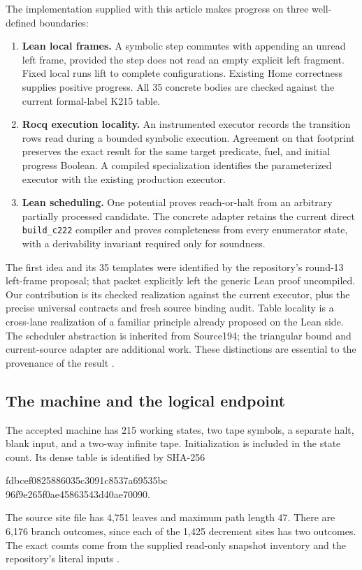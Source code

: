 \documentclass[11pt,letterpaper]{article}
\theoremstyle{definition}
\theoremstyle{remark}
\newcommand{\code}[1]{\texttt{#1}}
\begin{document}
The implementation supplied with this article makes progress on three
well-defined boundaries:

\begin{enumerate}
\item \textbf{Lean local frames.} A symbolic step commutes with appending an
unread left frame, provided the step does not read an empty explicit left
fragment. Fixed local runs lift to complete configurations. Existing Home
correctness supplies positive progress. All 35 concrete bodies are checked
against the current formal-label K215 table.
\item \textbf{Rocq execution locality.} An instrumented executor records
the transition rows read during a bounded symbolic execution. Agreement on
that footprint preserves the exact result for the same target predicate, fuel, and
initial progress Boolean. A compiled specialization identifies
the parameterized executor with the existing production executor.
\item \textbf{Lean scheduling.} One potential proves reach-or-halt from
an arbitrary partially processed candidate. The concrete adapter retains the
current direct \code{build\_c222} compiler and proves completeness from every
enumerator state, with a derivability invariant required only for soundness.
\end{enumerate}

The first idea and its 35 templates were identified by the repository's
round-13 left-frame proposal; that packet explicitly left the generic Lean
proof uncompiled. Our contribution is its checked realization against the
current executor, plus the precise universal contracts and fresh source
binding audit. Table locality is a cross-lane realization of a familiar
principle already proposed on the Lean side. The scheduler abstraction is
inherited from Source194; the triangular bound and current-source adapter
are additional work. These distinctions are essential to the provenance of
the result \cite{round13,fusion,scheduler}.

\subsection{The machine and the logical endpoint}

The accepted machine has 215 working states, two tape symbols, a separate
halt, blank input, and a two-way infinite tape. Initialization is included in
the state count. Its dense table is identified by SHA-256
\begin{center}\small\ttfamily
fdbcef0825886035c3091c8537a69535bc\\
96f9e265f0ae45863543d40ae70090.
\end{center}
The source site file has 4,751 leaves and maximum path length 47. There are
6,176 branch outcomes, since each of the 1,425 decrement sites has two outcomes.
The exact counts come from the supplied read-only snapshot inventory and
the repository's literal inputs \cite{candidate,verification}.
\end{document}
